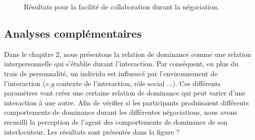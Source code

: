 	\begin{figure}[h]
		
		
		\caption{Résultats pour la facilité de collaboration durant la négociation.}
		\label{fig:aise}
	\end{figure}
	
	
	\subsection{Analyses complémentaires}
	Dans le chapitre 2, nous présentons la relation de dominance comme une relation interpersonnelle qui s'établie durant l'interaction. 
	Par conséquent, en plus du trais de personnalité, un individu est influencé par l'environnement de l'interaction (\textit{e.g} contexte de l'interaction, rôle social ...). Ces différents paramètres vont créer une certaine relation de dominance qui peut varier d'une interaction à une autre.  
	Afin de vérifier si les participants produisaient différents comportements de dominance durant les différentes négociations, nous avons recueilli la perception de l'agent des comportements de dominance de son interlocuteur.  Les résultats sont présentés dans la figure ?
	
